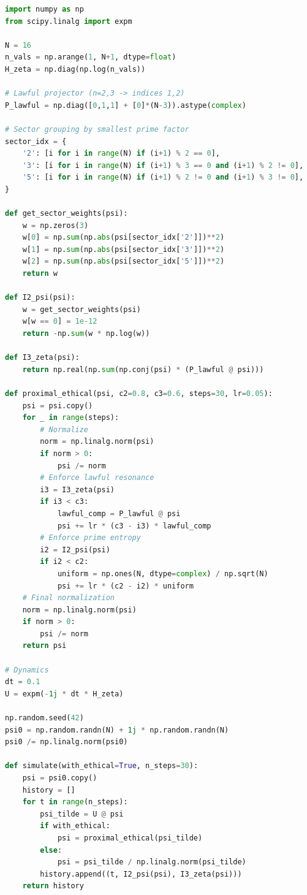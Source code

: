 \documentclass[11pt]{article}
\begin{document}
\begin{lstlisting}[language=Python,caption={Minimal NumPy implementation of the 16D zeta toy model.}]
import numpy as np
from scipy.linalg import expm

N = 16
n_vals = np.arange(1, N+1, dtype=float)
H_zeta = np.diag(np.log(n_vals))

# Lawful projector (n=2,3 -> indices 1,2)
P_lawful = np.diag([0,1,1] + [0]*(N-3)).astype(complex)

# Sector grouping by smallest prime factor
sector_idx = {
    '2': [i for i in range(N) if (i+1) % 2 == 0],
    '3': [i for i in range(N) if (i+1) % 3 == 0 and (i+1) % 2 != 0],
    '5': [i for i in range(N) if (i+1) % 2 != 0 and (i+1) % 3 != 0],
}

def get_sector_weights(psi):
    w = np.zeros(3)
    w[0] = np.sum(np.abs(psi[sector_idx['2']])**2)
    w[1] = np.sum(np.abs(psi[sector_idx['3']])**2)
    w[2] = np.sum(np.abs(psi[sector_idx['5']])**2)
    return w

def I2_psi(psi):
    w = get_sector_weights(psi)
    w[w == 0] = 1e-12
    return -np.sum(w * np.log(w))

def I3_zeta(psi):
    return np.real(np.sum(np.conj(psi) * (P_lawful @ psi)))

def proximal_ethical(psi, c2=0.8, c3=0.6, steps=30, lr=0.05):
    psi = psi.copy()
    for _ in range(steps):
        # Normalize
        norm = np.linalg.norm(psi)
        if norm > 0:
            psi /= norm
        # Enforce lawful resonance
        i3 = I3_zeta(psi)
        if i3 < c3:
            lawful_comp = P_lawful @ psi
            psi += lr * (c3 - i3) * lawful_comp
        # Enforce prime entropy
        i2 = I2_psi(psi)
        if i2 < c2:
            uniform = np.ones(N, dtype=complex) / np.sqrt(N)
            psi += lr * (c2 - i2) * uniform
    # Final normalization
    norm = np.linalg.norm(psi)
    if norm > 0:
        psi /= norm
    return psi

# Dynamics
dt = 0.1
U = expm(-1j * dt * H_zeta)

np.random.seed(42)
psi0 = np.random.randn(N) + 1j * np.random.randn(N)
psi0 /= np.linalg.norm(psi0)

def simulate(with_ethical=True, n_steps=30):
    psi = psi0.copy()
    history = []
    for t in range(n_steps):
        psi_tilde = U @ psi
        if with_ethical:
            psi = proximal_ethical(psi_tilde)
        else:
            psi = psi_tilde / np.linalg.norm(psi_tilde)
        history.append((t, I2_psi(psi), I3_zeta(psi)))
    return history
\end{lstlisting}
\end{document}
